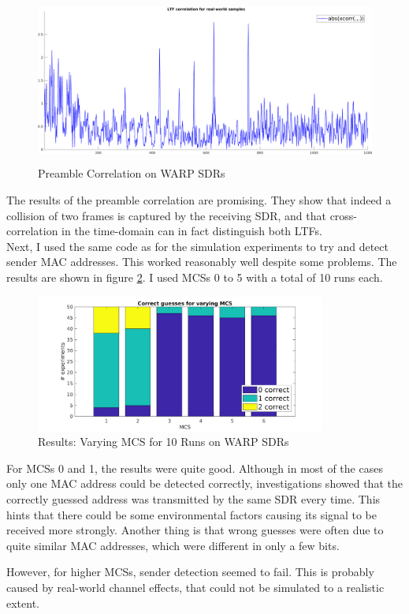 \begin{figure}[H]
	\centering
  \includegraphics[height=5.5cm]{gfx/plots/warp-preamble}
	\caption{Preamble Correlation on WARP SDRs}
	\label{fig:warp_preamble_corr}
\end{figure}

The results of the preamble correlation are promising. They show that indeed a collision of two frames is captured by the receiving \gls{SDR}, and that cross-correlation in the time-domain can in fact distinguish both \glspl{LTF}.\\

Next, I used the same code as for the simulation experiments to try and detect sender \gls{MAC} addresses. This worked reasonably well despite some problems. The results are shown in figure \ref{fig:warp-mcs-results}. I used \glspl{MCS} 0 to 5 with a total of 10 runs each.

\begin{figure}[H]
	\centering
	\includegraphics[height=4.5cm]{gfx/plots/warp-mcs}
	\caption{Results: Varying MCS for 10 Runs on WARP SDRs}
	\label{fig:warp-mcs-results}
\end{figure}

For \glspl{MCS} 0 and 1, the results were quite good. Although in most of the cases only one \gls{MAC} address could be detected correctly, investigations showed that the correctly guessed address was transmitted by the same \gls{SDR} every time. This hints that there could be some environmental factors causing its signal to be received more strongly. Another thing is that wrong guesses were often due to quite similar \gls{MAC} addresses, which were different in only a few bits.

However, for higher \glspl{MCS}, sender detection seemed to fail. This is probably caused by real-world channel effects, that could not be simulated to a realistic extent.

